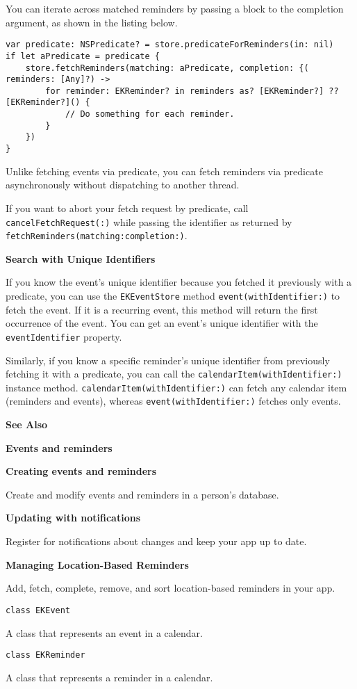 \documentclass{article}
\begin{document}
You can iterate across matched reminders by passing a block to the completion argument, as shown in the listing below.

\begin{verbatim}
var predicate: NSPredicate? = store.predicateForReminders(in: nil)
if let aPredicate = predicate {
    store.fetchReminders(matching: aPredicate, completion: {( reminders: [Any]?) ->
        for reminder: EKReminder? in reminders as? [EKReminder?] ?? [EKReminder?]() {
            // Do something for each reminder.
        }
    })
}
\end{verbatim}

Unlike fetching events via predicate, you can fetch reminders via predicate asynchronously without dispatching to another thread.

If you want to abort your fetch request by predicate, call \texttt{cancelFetchRequest(:)} while passing the identifier as returned by \texttt{fetchReminders(matching:completion:)}.

\textbf{Search with Unique Identifiers}

If you know the event's unique identifier because you fetched it previously with a predicate, you can use the \texttt{EKEventStore} method \texttt{event(withIdentifier:)} to fetch the event. If it is a recurring event, this method will return the first occurrence of the event. You can get an event's unique identifier with the \texttt{eventIdentifier} property.

Similarly, if you know a specific reminder's unique identifier from previously fetching it with a predicate, you can call the \texttt{calendarItem(withIdentifier:)} instance method. \texttt{calendarItem(withIdentifier:)} can fetch any calendar item (reminders and events), whereas \texttt{event(withIdentifier:)} fetches only events.

\textbf{See Also}

\textbf{Events and reminders}

\textbf{Creating events and reminders}

Create and modify events and reminders in a person's database.

\textbf{Updating with notifications}

Register for notifications about changes and keep your app up to date.

\textbf{Managing Location-Based Reminders}

Add, fetch, complete, remove, and sort location-based reminders in your app.

\texttt{class EKEvent}

A class that represents an event in a calendar.

\texttt{class EKReminder}

A class that represents a reminder in a calendar.

\newpage
\end{document}
